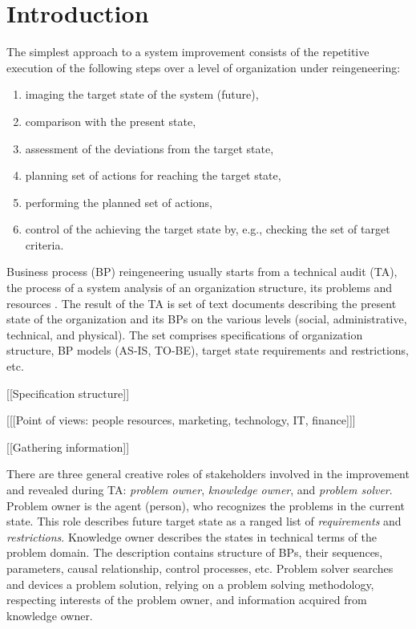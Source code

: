 \documentclass[conference]{IEEEtran}
\begin{document}
\section{Introduction}
\label{sec:intro}

The simplest approach to a system improvement consists of the repetitive execution of the following steps over a level of organization under reingeneering:
\begin{enumerate}
\item imaging the target state of the system (future),
\item comparison with the present state,
\item assessment of the deviations from the target state,
\item planning set of actions for reaching the target state,
\item performing the planned set of actions,
\item control of the achieving the target state by, e.g., checking the set of target criteria.
\end{enumerate}

Business process (BP) reingeneering usually starts from a technical audit (TA), the process of a system analysis of an organization structure, its problems and resources \cite{techaudit}.  The result of the TA is set of text documents describing the present state of the organization and its BPs on the various levels (social, administrative, technical, and physical).  The set comprises specifications of organization structure, BP models (AS-IS, TO-BE), target state requirements and restrictions, etc.

[[Specification structure]]

[[[Point of views: people resources, marketing, technology, IT, finance]]]

[[Gathering information]]

There are three general creative roles of stakeholders involved in the improvement and revealed during TA: \emph{problem owner}, \emph{knowledge owner}, and \emph{problem solver}.  Problem owner is the agent (person), who recognizes the problems in the current state.  This role describes future target state as a ranged list of \emph{requirements} and \emph{restrictions}.  Knowledge owner describes the states in technical terms of the problem domain.  The description contains structure of BPs, their sequences, parameters, causal relationship, control processes, etc.  Problem solver searches and devices a problem solution, relying on a problem solving methodology, respecting interests of the problem owner, and information acquired from knowledge owner.
\end{document}
